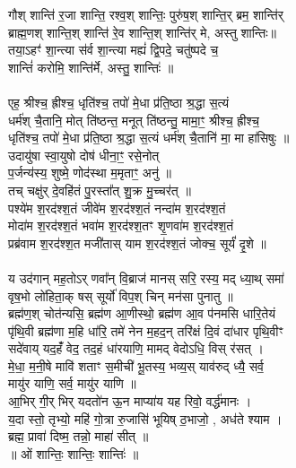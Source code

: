 गौश् शान्ति॑ र॒जा शान्ति॒ रश्व॒श् शान्तिः॒ पुरु॑ष॒श् शान्ति॒र् ब्रम॒  शान्ति॑र्\\
ब्राह्म॒णश् शान्ति॒श् शान्ति॑ रे॒व शान्ति॒श् शान्ति॑र् मे, अस्तु शान्तिः॥\\
तया॒ऽहꣳ॑ शा॒न्त्या स॑र्व शा॒न्त्या मह्यं॑ द्वि॒पदे॒ चतु॑ष्पदे च॒ \\
शान्तिं॑ करोमि॒ शान्ति॑र्मे, अस्तु॒ शान्तिः॑ ॥\\
\\
एह॒ श्रीश्च॒ ह्रीश्च॒ धृति॑श्च॒ तपो॑ मे॒धा प्र॑ति॒ष्ठा श्र॒द्धा स॒त्यं \\
धर्म॑श् चै॒तानि॒ मोत् ति॑ष्ठन्त॒ मनूत् ति॑ष्ठन्तु॒ मामा॒॒ꣳ॒ श्रीश्च॒ ह्रीश्च॒ \\
धृति॑श्च॒ तपो॑ मे॒धा प्र॑ति॒ष्ठा श्र॒द्धा स॒त्यं धर्म॑श् चै॒तानि॑ मा॒ मा हा॑सिषुः ॥\\
उदायु॑षा स्वा॒युषो दोष॑ धीना॒ꣳ॒ रसे॒नोत् \\
प॒र्जन्य॑स्य॒ शुष्मे॒ णोद॑स्था म॒मृताꣳ॒ अनु॑ ॥\\
तच् चक्षु॑र् दे॒वहि॑तं पु॒रस्ता᳚त् शु॒क्र मु॒च्चर॑त् ॥\\
पश्ये॑म श॒रद॑श्श॒तं जीवे॑म श॒रद॑श्श॒तं नन्दा॑म श॒रद॑श्श॒तं \\
मोदा॑म श॒रद॑श्श॒तं भवा॑म श॒रद॑श्श॒तꣳ शृ॒णवा॑म श॒रद॑श्श॒तं \\
प्रब्र॑वाम श॒रद॑श्श॒त मजी॑तास् याम श॒रद॑श्श॒तं जोक्च॒ सूर्यं॑ दृ॒शे ॥\\
\\
य उद॑गान् मह॒तोऽर् णवा᳚न् वि॒ब्राज॑ मानस् सरि॒ रस्य॒ मद् ध्या॒थ् समा॑\\
वृष॒भो लो॑हिता॒क् षस् सूर्यो॑ विप॒श् चिन् मन॑सा पुनातु ॥\\
ब्रह्म॑ण॒श् चोत॑न्यसि॒ ब्रह्म॑ण आ॒णीस्थो॒ ब्रह्म॑ण आ॒व प॑नमसि धारि॒तेयं \\
पृ॑थि॒वी ब्रह्म॑णा म॒हि धा॑रि॒ तमे॑ नेन म॒हद॒न् तरि॑क्षं दि॒वं दा॑धार पृथि॒वीꣳ \\
सदे॑वाय् यद॒हंँ वेद॒ तद॒हं धा॑रयाणि॒ मामद् वेदोऽधि॒ विस् र॑सत् । \\
मे॒धा॒ म॒नी॒षे मावि॑ शताꣳ स॒मीची॑ भू॒तस्य॒ भव्य॒स् याव॑रुद् ध्यै॒ सर्व॒ \\
मायु॑र याणि॒ सर्व॒ मायु॑र याणि ॥\\
आ॒भिर् गी॒र् भिर् यदतो॑न ऊ॒न माप्या॑य यह रिवो॒ वर्द्ध॑मानः । \\
य॒दा स्तो॒ तृभ्यो॒ महि॑ गो॒त्रा रु॒जासि॑ भूयिष् ठ॒भाजो॒ , अध॑ते श्याम ।\\
ब्रह्म॒ प्रावा॑ दिष्म॒ तन्नो॒ माहा॑ सीत् ॥\\
॥ ओं शान्तिः॒ शान्तिः॒ शान्तिः॑ ॥\\
